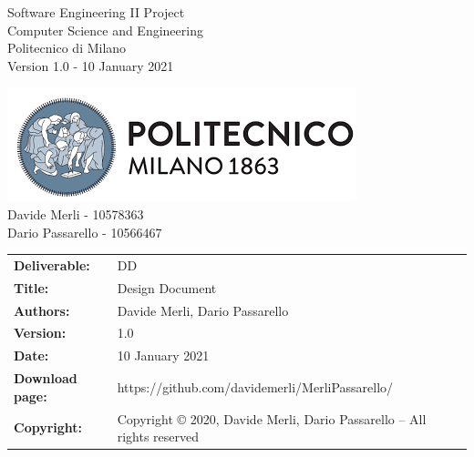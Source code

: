 \begin{titlepage}
\begin{center}
    \begin{multicols}{2}
      \large
      \begin{flushleft}
        Software Engineering II Project \\
        Computer Science and Engineering\\
        Politecnico di Milano\\
        Version 1.0 - 10 January 2021 \\
      \end{flushleft}
      \begin{flushright}
        \includegraphics[scale=0.6]{Images/PolimiLogo.png} \\
        Davide Merli - 10578363\\
        Dario Passarello - 10566467 \\
      \end{flushright}
    \end{multicols}
  \end{center}

\end{titlepage}

\begin{table}[h!]
  \begin{tabu} to \textwidth { X[0.4,r,p] X[0.7,l,p] }
    \hline

    \textbf{Deliverable:}   & DD                                                                     \\
    \textbf{Title:}         & Design Document                                                        \\
    \textbf{Authors:}       & Davide Merli, Dario Passarello                                         \\
    \textbf{Version:}       & 1.0                                                                    \\
    \textbf{Date:}          &    10 January 2021                                                                     \\
    \textbf{Download page:} & https://github.com/davidemerli/MerliPassarello/                        \\
    \textbf{Copyright:}     & Copyright © 2020, Davide Merli, Dario Passarello – All rights reserved \\
    \hline
  \end{tabu}
\end{table}




